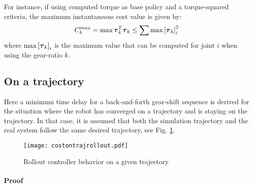 For instance, if using computed torque as base policy and a torque-squared criteria, the maximum instantaneous cost value is given by:
%
\begin{align}
C_k^{max} =  \operatornamewithlimits{max} \vec{\tau}_k^T \vec{\tau}_k \leq \sum \operatornamewithlimits{max} \left[\vec{\tau}_{k}\right]_{i}^2 
\end{align}
%
where $\operatornamewithlimits{max} \left[\vec{\tau}_{k}\right]_{i}$ is the maximum value that can be computed for joint $i$ when using the gear-ratio $k$.

\subsection{On a trajectory}
\label{sec:chat1}

Here a minimum time delay for a back-and-forth gear-shift sequence is derived for the situation where the robot has converged on a trajectory and is staying on the trajectory. In that case, it is assumed that both the simulation trajectory and the real system follow the same desired trajectory, see Fig. \ref{fig:costontrajrollout}.

\begin{figure}[H]
	\centering
		\texttt{[image: costontrajrollout.pdf]}
	\caption{Rollout controller behavior on a given trajectory}
	\label{fig:costontrajrollout}
\end{figure}


\paragraph{Proof} 

